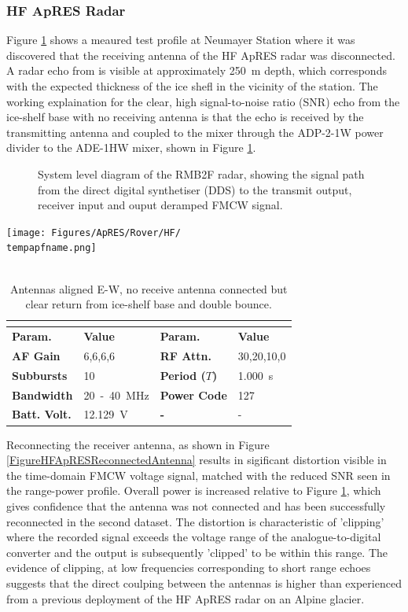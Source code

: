 \documentclass[a4paper,12pt]{article}
\newcommand{\apresdoc}[9]{
    \def\tempapfname{#1}
    \def\tempaploc{#2}
    \def\tempapcom{#3}
    \def\temptimestamp{#4}
    \def\tempafgain{#5}
    \def\temprfattn{#6}
    \def\tempperiod{#7}
    \def\tempflow{#8}
    \def\tempfupp{#9}
    \apresdoccont
}
\newcommand{\apresdoccont}[6]{
  \def\tempnatt{#1}
  \def\tempnchirp{#2}
  \def\tempnsubburst{#3}
  \def\temppowercode{#4}
  \def\tempbattvolt{#5}
  \def\tempaplbl{#6}

  \begin{table}
    \caption{\tempapcom}
    \rowcolors{2}{gray!25}{white}
    \centering
    \texttt{[image: Figures/ApRES/Rover/HF/\\tempapfname.png]}
    \\
    ~\\
    \begin{tabular}{>{\bfseries}l l >{\bfseries}l l}
      \hline
      \rowcolor{gray!50}
      \multicolumn{4}{c}{\textbf{Filename} \tempapfname} \\
      \hline
      Param. & \bfseries Value & Param. & \bfseries Value \\
      AF Gain & \tempafgain &
      RF Attn. & \temprfattn \\
      Subbursts & \tempnsubburst &
      Period ($T$) & \tempperiod~s \\
      Bandwidth & \tempflow~-~\tempfupp~MHz &
      Power Code & \temppowercode \\
      Batt. Volt. & \tempbattvolt~V &
      - & - \\
      \hline
    \end{tabular}
    \label{\tempaplbl}
  \end{table}
}
\begin{document}
\subsubsection*{HF ApRES Radar}
Figure \ref{FigureHFApRESNoReceiveAntenna} shows a meaured test profile at
Neumayer Station where it was discovered that the receiving antenna of the HF
ApRES radar was disconnected.  A radar echo from is visible at approximately 
\SI{250}{\metre} depth, which corresponds with the expected thickness of the ice
shefl in the vicinity of the station.  The working explaination for the clear,
high signal-to-noise ratio (SNR) echo from the ice-shelf base with no receiving
antenna is that the echo is received by the transmitting antenna and coupled to
the mixer through the ADP-2-1W power divider to the ADE-1HW mixer, shown in
Figure \ref{FigureHFApRESRadarArchitecture}.

\begin{figure}[h]
  \centering
  
  \caption{
    System level diagram of the RMB2F radar, showing the signal path from the
    direct digital synthetiser (DDS) to the transmit output, receiver input and
    ouput deramped FMCW signal.}
  \label{FigureHFApRESRadarArchitecture}
\end{figure}

\apresdoc
{2021-12-28\_213752.dat}
{Neumayer III}
{Antennas aligned E-W, no receive antenna connected but clear return from
ice-shelf base and double bounce.}
{2021-12-28 21:37:53.000}
{6,6,6,6}
{30,20,10,0}
{1.000}
{20}
{40}
{4}
{40}
{10}
{127}
{12.129}
{FigureHFApRESNoReceiveAntenna}

Reconnecting the receiver antenna, as shown in Figure
\ref{FigureHFApRESReconnectedAntenna} results in sigificant distortion visible
in the time-domain FMCW voltage signal, matched with the reduced SNR seen in the
range-power profile.  Overall power is increased relative to Figure
\ref{FigureHFApRESNoReceiveAntenna}, which gives confidence that the antenna was
not connected and has been successfully reconnected in the second dataset.  The
distortion is characteristic of 'clipping' where the recorded signal exceeds the
voltage range of the analogue-to-digital converter and the output is
subsequently 'clipped' to be within this range.  The evidence of clipping, at
low frequencies corresponding to short range echoes suggests that the direct
coulping between the antennas is higher than experienced from a previous
deployment of the HF ApRES radar on an Alpine glacier. 
\end{document}
